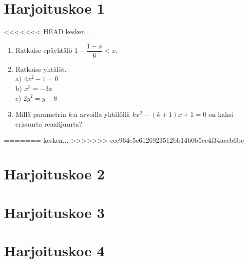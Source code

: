 \section{Harjoituskoe 1}

<<<<<<< HEAD
kesken... 
\begin{enumerate}
\item Ratkaise epäyhtälö $1-\dfrac{1-x}{6}<x$.
\item Ratkaise yhtälöt. \\ a) $4x^2-1=0$ \\ b) $x^3=-3x$ \\ c) $2y^2=y-8$
\item Millä parametrin $k$:n arvoilla yhtälöllä $kx^2-(k+1)x+1=0$ on kaksi erisuurta reaalijuurta? 

\end{enumerate}
=======
kesken...
>>>>>>> eee964e5c6126923512bb14b0b5ee4f34aceb6bc

\section{Harjoituskoe 2}


\section{Harjoituskoe 3}


\section{Harjoituskoe 4}